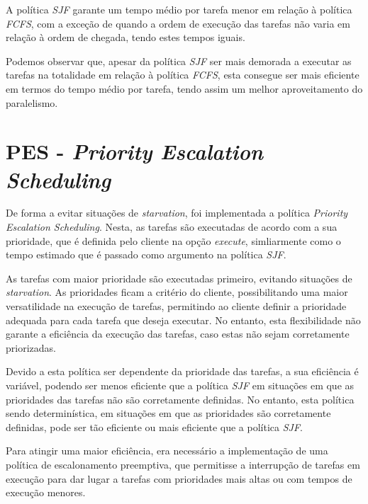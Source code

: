 \documentclass[a4paper,11pt]{scrreprt}
\begin{document}
        A política \textit{SJF} garante um tempo médio por tarefa menor em relação à política \textit{FCFS},
        com a exceção de quando a ordem de execução das tarefas não varia em relação à ordem de chegada,
        tendo estes tempos iguais.

        Podemos observar que, apesar da política \textit{SJF} ser mais demorada a executar
        as tarefas na totalidade em relação à política \textit{FCFS}, esta consegue ser mais eficiente
        em termos do tempo médio por tarefa, tendo assim um melhor aproveitamento do paralelismo.

    \section{\textbf{PES} - \textit{Priority Escalation Scheduling}}
        De forma a evitar situações de \textit{starvation}, foi implementada a política
        \textit{Priority Escalation Scheduling}. Nesta, as tarefas são executadas
        de acordo com a sua prioridade, que é definida pelo cliente na opção \textit{execute},
        simliarmente como o tempo estimado que é passado como argumento na política \textit{SJF}.

        As tarefas com maior prioridade são executadas primeiro, evitando
        situações de \textit{starvation}. As prioridades ficam a critério do cliente,
        possibilitando uma maior versatilidade na execução de tarefas, permitindo ao cliente
        definir a prioridade adequada para cada tarefa que deseja executar. No entanto, esta
        flexibilidade não garante a eficiência da execução das tarefas, caso estas não sejam
        corretamente priorizadas.

        \clearpage
        Devido a esta política ser dependente da prioridade das tarefas, a sua eficiência
        é variável, podendo ser menos eficiente que a política \textit{SJF} em situações
        em que as prioridades das tarefas não são corretamente definidas. No entanto, esta
        política sendo determinística, em situações em que as prioridades são corretamente
        definidas, pode ser tão eficiente ou mais eficiente que a política \textit{SJF}.

        Para atingir uma maior eficiência, era necessário a implementação de uma política
        de escalonamento preemptiva, que permitisse a interrupção de tarefas em execução
        para dar lugar a tarefas com prioridades mais altas ou com tempos de execução
        menores.
\end{document}
